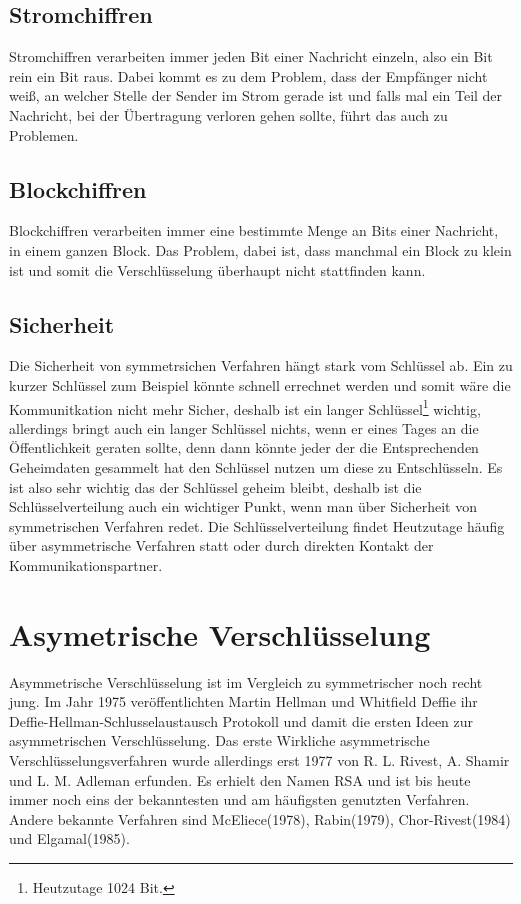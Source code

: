 \documentclass[a4paper,12pt,titlepage]{article}
\begin{document}
\subsection{Stromchiffren} 
Stromchiffren verarbeiten immer jeden Bit einer Nachricht einzeln, also ein Bit rein ein Bit raus. Dabei kommt es zu dem Problem, dass der Empfänger nicht weiß, an welcher Stelle der Sender im Strom gerade ist und falls mal ein Teil der Nachricht, bei der Übertragung verloren gehen sollte, führt das auch zu Problemen.
\subsection{Blockchiffren}
Blockchiffren verarbeiten immer eine bestimmte Menge an Bits einer Nachricht, in einem ganzen Block. Das Problem, dabei ist, dass manchmal ein Block zu klein ist und somit die Verschlüsselung überhaupt nicht stattfinden kann.

\subsection{Sicherheit}\label{symm:secu}
Die Sicherheit von symmetrsichen Verfahren hängt stark vom Schlüssel ab. Ein zu kurzer Schlüssel zum Beispiel könnte schnell errechnet werden und somit wäre die Kommunitkation nicht mehr Sicher, deshalb ist ein langer Schlüssel\footnote{Heutzutage 1024 Bit.} wichtig, allerdings bringt auch ein langer Schlüssel nichts, wenn er eines Tages an die Öffentlichkeit geraten sollte, denn dann könnte jeder der die Entsprechenden Geheimdaten gesammelt hat den Schlüssel nutzen um diese zu Entschlüsseln. Es ist also sehr wichtig das der Schlüssel geheim bleibt, deshalb ist die Schlüsselverteilung auch ein wichtiger Punkt, wenn man über Sicherheit von symmetrischen Verfahren redet. Die Schlüsselverteilung findet Heutzutage häufig über asymmetrische Verfahren statt oder durch direkten Kontakt der Kommunikationspartner.

\section{Asymetrische Verschlüsselung}\label{asymm}
Asymmetrische Verschlüsselung ist im Vergleich zu symmetrischer noch recht jung. Im Jahr 1975 veröffentlichten Martin Hellman und Whitfield Deffie ihr Deffie-Hellman-Schlusselaustausch Protokoll und damit die ersten Ideen zur asymmetrischen Verschlüsselung. Das erste Wirkliche asymmetrische Verschlüsselungsverfahren wurde allerdings erst 1977 von R. L. Rivest, A. Shamir und L. M. Adleman erfunden. Es erhielt den Namen RSA und ist bis heute immer noch eins der bekanntesten und am häufigsten genutzten Verfahren. Andere bekannte Verfahren sind McEliece(1978), Rabin(1979), Chor-Rivest(1984) und Elgamal(1985).
\end{document}
